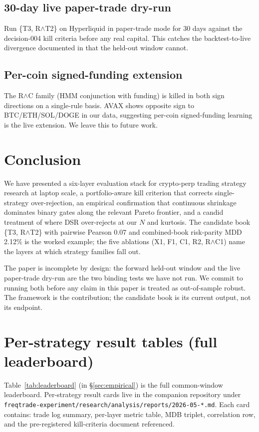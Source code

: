 \documentclass[11pt]{article}
\begin{document}
\subsection{30-day live paper-trade dry-run}
Run \{T3, R$\wedge$T2\} on Hyperliquid in paper-trade mode for 30 days
against the decision-004 kill criteria before any real capital. This catches
the backtest-to-live divergence documented in
\citet{backtestlive2026} that the held-out window cannot.

\subsection{Per-coin signed-funding extension}
The R$\wedge$C family (HMM conjunction with funding) is killed in both
sign directions on a single-rule basis. AVAX shows opposite sign to
BTC/ETH/SOL/DOGE in our data, suggesting per-coin signed-funding learning is
the live extension. We leave this to future work.

\section{Conclusion}
\label{sec:conclusion}

We have presented a six-layer evaluation stack for crypto-perp trading
strategy research at laptop scale, a portfolio-aware kill criterion that
corrects single-strategy over-rejection, an empirical confirmation that
continuous shrinkage dominates binary gates along the relevant Pareto
frontier, and a candid treatment of where DSR over-rejects at our $N$ and
kurtosis. The candidate book \{T3, R$\wedge$T2\} with pairwise Pearson 0.07
and combined-book risk-parity MDD 2.12\% is the worked example; the five
ablations (X1, F1, C1, R2, R$\wedge$C1) name the layers at which strategy
families fall out.

The paper is incomplete by design: the forward held-out window and the live
paper-trade dry-run are the two binding tests we have not run. We commit to
running both before any claim in this paper is treated as out-of-sample
robust. The framework is the contribution; the candidate book is its current
output, not its endpoint.



\appendix

\section{Per-strategy result tables (full leaderboard)}
\label{app:leaderboard}
Table~\ref{tab:leaderboard} (in \S\ref{sec:empirical}) is the full
common-window leaderboard. Per-strategy result cards live in the companion
repository under
\texttt{freqtrade-experiment/research/analysis/reports/2026-05-*.md}. Each card contains: trade
log summary, per-layer metric table, MDB triplet, correlation row, and the
pre-registered kill-criteria document referenced.
\end{document}
